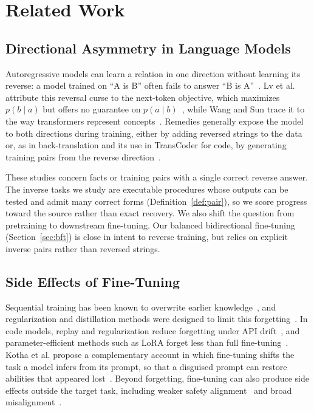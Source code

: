 
\section{Related Work}
\label{sec:related}

\subsection{Directional Asymmetry in Language Models}
\label{sec:rw-reversal}

Autoregressive models can learn a relation in one direction without learning its reverse: a model trained on ``A is B'' often fails to answer ``B is A''~\cite{berglund2024reversal, grosse2023influence}.
Lv et al. attribute this reversal curse to the next-token objective, which maximizes $p(b \mid a)$ but offers no guarantee on $p(a \mid b)$~\cite{lv2024reversal}, while Wang and Sun trace it to the way transformers represent concepts~\cite{wang2025binding}.
Remedies generally expose the model to both directions during training, either by adding reversed strings to the data~\cite{golovneva2024reverse} or, as in back-translation and its use in TransCoder for code, by generating training pairs from the reverse direction~\cite{sennrich2016backtranslation, lachaux2021unsupervised}.

These studies concern facts or training pairs with a single correct reverse answer.
The inverse tasks we study are executable procedures whose outputs can be tested and admit many correct forms (Definition~\ref{def:pair}), so we score progress toward the source rather than exact recovery.
We also shift the question from pretraining to downstream fine-tuning.
Our balanced bidirectional fine-tuning (Section~\ref{sec:bft}) is close in intent to reverse training, but relies on explicit inverse pairs rather than reversed strings.

\subsection{Side Effects of Fine-Tuning}
\label{sec:rw-forgetting}

Sequential training has been known to overwrite earlier knowledge~\cite{mccloskey1989catastrophic, french1999catastrophic}, and regularization and distillation methods were designed to limit this forgetting~\cite{kirkpatrick2017overcoming, li2018lwf}.
In code models, replay and regularization reduce forgetting under API drift~\cite{weyssow2023continual}, and parameter-efficient methods such as LoRA forget less than full fine-tuning~\cite{biderman2024lora}.
Kotha et al. propose a complementary account in which fine-tuning shifts the task a model infers from its prompt, so that a disguised prompt can restore abilities that appeared lost~\cite{kotha2024implicit}.
Beyond forgetting, fine-tuning can also produce side effects outside the target task, including weaker safety alignment~\cite{qi2024finetuning} and broad misalignment~\cite{betley2025emergent}.

